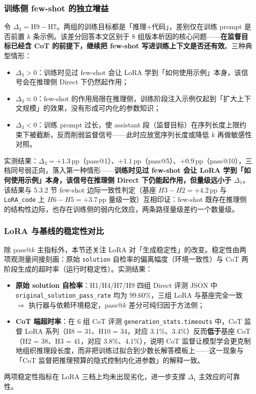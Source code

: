\subsubsection{训练侧 few-shot 的独立增益}
令 $\Delta_3 = \mathrm{H9} - \mathrm{H7}$。两组的训练目标都是「推理+代码」，差别仅在训练 prompt 是否前置 $k$ 条示例。该差分回答本文区别于 8 组版本析因的核心问题——\textbf{在监督目标已经含 CoT 的前提下，继续把 few-shot 写进训练上下文是否还有效}。三种典型情形：
\begin{itemize}
    \item $\Delta_3 > 0$：训练时见过 few-shot 会让 LoRA 学到「如何使用示例」本身，该信号会在推理侧 Direct 下仍然起作用；
    \item $\Delta_3 \approx 0$：few-shot 的作用局限在推理侧，训练阶段注入示例仅起到「扩大上下文规模」的效果，没有形成可内化的参数知识；
    \item $\Delta_3 < 0$：训练 prompt 过长，使 assistant 段（监督目标）在序列长度上限约束下被截断，反而削弱监督信号——此时应放宽序列长度或降低 $k$ 再做敏感性对照。
\end{itemize}
实测结果：$\Delta_3 = +1.3$\,pp（pass@1）、$+1.1$\,pp（pass@5）、$+0.9$\,pp（pass@10），三档同号弱正向，落入第一种情形——\textbf{训练时见过 few-shot 会让 LoRA 学到「如何使用示例」本身，该信号在推理侧 Direct 下仍能起作用，但量级远小于 $\Delta_1$}。该结果与 5.3.2 节 few-shot 边际一致性判定（基座 $H3-H2=+4.2$\,pp 与 \texttt{LoRA\_code} 上 $H6-H5=+3.7$\,pp 量级一致）互相印证：few-shot 既存在推理侧的结构性边际，也存在训练侧的弱内化效应，两条路径量级差约一个数量级。

\subsubsection{LoRA 与基线的稳定性对比}
除 pass@$k$ 主指标外，本节还关注 LoRA 对「生成稳定性」的改变。稳定性由两项观测量间接刻画：原始 \texttt{solution} 自检率的偏离幅度（环境一致性）与 CoT 两阶段生成的超时率（运行时稳定性）。实测结果：
\begin{itemize}
    \item \textbf{原始 solution 自检率}：H1/H4/H7/H9 四组 Direct 评测 JSON 中 \texttt{original\_solution\_pass\_rate} 均为 99.60\%，三组 LoRA 与基座完全一致 $\Rightarrow$ 执行器与依赖环境稳定，pass@$k$ 差分可纯归因于方法侧；
    \item \textbf{CoT 端超时率}：在 6 组 CoT 评测 \texttt{generation\_stats.timeouts} 中，CoT 监督 LoRA 系列（H8 = 31、H10 = 34，对应 3.1\%、3.4\%）反而\textbf{低于}基座 CoT（H2 = 38、H3 = 41，对应 3.8\%、4.1\%），说明 CoT 监督让模型学会更克制地组织推理段长度，而非把训练过拟合到少数长解答模板上——这一现象与「CoT 监督把推理预算的隐式控制内化进参数」的解释一致。
\end{itemize}
两项稳定性指标在 LoRA 三档上均未出现劣化，进一步支撑 $\Delta_1$ 主效应的可靠性。